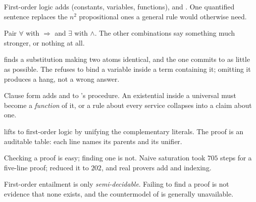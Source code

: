 \begin{chaptersummary}
\begin{tight}
  \item First-order logic adds  (constants, variables, functions),
         and . One quantified sentence replaces
        the $n^{2}$ propositional ones a general rule would otherwise need.
  \item Pair $\forall$ with $\Rightarrow$ and $\exists$ with $\wedge$. The other
        combinations say something much stronger, or nothing at all.
  \item {} finds a substitution making two atoms identical, and the
         one commits to as little as possible. The  refuses to bind a variable inside a term containing it; omitting it
        produces a hang, not a wrong answer.
  \item Clause form adds  and  to
        's procedure. An existential inside a universal must
        become a \emph{function} of it, or a rule about every service collapses
        into a claim about one.
  \item {} lifts to first-order logic by unifying the complementary
        literals. The proof is an auditable table: each line names its parents and
        its unifier.
  \item Checking a proof is easy; finding one is not. Naive saturation took $705$
        steps for a five-line proof;  reduced it to $202$, and
        real provers add  and indexing.
  \item First-order entailment is only \emph{semi-decidable}. Failing to find a
        proof is not evidence that none exists, and the countermodel of
         is generally unavailable.
\end{tight}
\end{chaptersummary}

